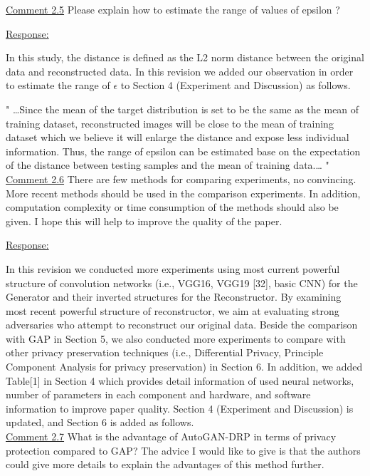 \documentclass[]{elsarticle}
\begin{document}
\color{blue}
\underline{Comment 2.5}
Please explain how to estimate the range of values of epsilon ?


\color{black}
\underline{Response:}

In this study, the distance is defined as the L2 norm distance between the original data and reconstructed data. In this revision we added our observation in order to estimate the range of $\epsilon$ to Section 4 (Experiment and Discussion) as follows.  

" 
\dots Since the mean of the target distribution is set to be the same as the mean of training dataset, reconstructed images will be close to the mean of training dataset which we believe it will enlarge the distance and expose less individual information. Thus, the range of epsilon can be estimated base on the expectation of the distance between testing samples and the mean of training data.\dots
"\\


\color{blue}
\underline{Comment 2.6}
There are few methods for comparing experiments, no convincing. More recent methods should be used in the comparison experiments. In addition, computation complexity or time consumption of the methods should also be given. I hope this will help to improve the quality of the paper.

\color{black}
\underline{Response:}


In this revision we conducted more experiments using most current powerful structure of convolution networks (i.e., VGG16, VGG19 [32], basic CNN) for the Generator and their inverted structures for the Reconstructor. By examining most recent powerful structure of reconstructor, we aim at evaluating strong adversaries who attempt to reconstruct our original data. Beside the comparison with GAP in Section 5, we also conducted more experiments to compare with other privacy preservation techniques (i.e., Differential Privacy, Principle Component Analysis for privacy preservation) in Section 6. In addition, we added Table[1] in Section 4 which provides detail information of used neural networks, number of parameters in each component and hardware, and software information to improve paper quality. 
Section 4 (Experiment and Discussion) is updated, and Section 6 is added as follows.\\


\color{blue}
\underline{Comment 2.7}
What is the advantage of AutoGAN-DRP in terms of privacy protection compared to GAP?  The advice I would like to give is that the authors could give more details to explain the advantages of this method further. 
\end{document}
